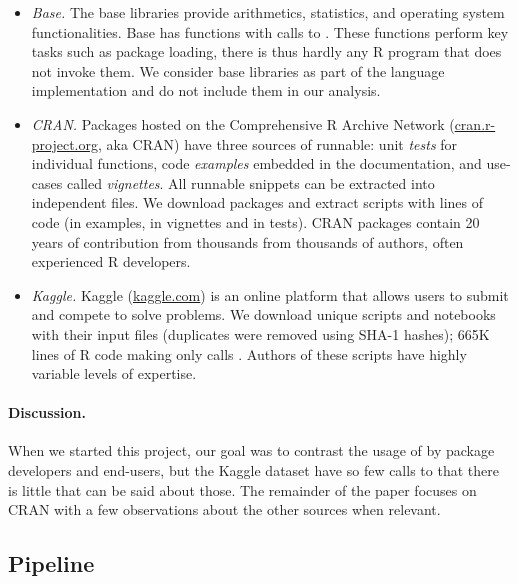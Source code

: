 \documentclass[screen,acmsmall]{acmart}%
\begin{document}
\begin{itemize}[$-$]

\item \emph{Base.} The \BasePackages base libraries provide arithmetics,
  statistics, and operating system functionalities. Base has \BaseFunsWithEvals
  functions with \BaseEvalCallSites calls to \eval. These functions perform key
  tasks such as package loading, there is thus hardly any R program that does
  not invoke them. We consider base libraries as part of the language
  implementation and do not include them in our analysis.

\item \emph{CRAN.} Packages hosted on the Comprehensive R Archive Network
  ({\small \url{cran.r-project.org}}, aka CRAN) have three sources of runnable:
  unit \emph{tests} for individual functions, code \emph{examples} embedded in
  the documentation, and use-cases called \emph{vignettes}. All runnable
  snippets can be extracted into independent files. We download \CranPackages
  packages and extract \CranRunnableScripts scripts with \CranRunnableCode
  lines of code (\CranRunnableCodeExamplesRnd in examples,
  \CranRunnableCodeVignettesRnd in vignettes and \CranRunnableCodeTestsRnd in
  tests). CRAN packages contain 20 years of contribution from thousands from
  thousands of authors, often experienced R developers.

\item \emph{Kaggle.} Kaggle ({\small \url{kaggle.com}}) is an online platform
  that allows users to submit and compete to solve problems. We download
  \KaggleUnique unique scripts and notebooks with their input files
  (\KaggleDuplicates duplicates were removed using SHA-1 hashes); 665K lines of
  R code making only \KaggleWithEvals calls \eval. Authors of these scripts
  have highly variable levels of expertise.

\end{itemize}


\paragraph{Discussion.} When we started this project, our goal was to contrast the
usage of \eval by package developers and end-users, but the Kaggle dataset have
so few calls to \eval that there is little that can be said about those. The
remainder of the paper focuses on CRAN with a few observations about the other
sources when relevant.


\subsection{Pipeline}
\end{document}
